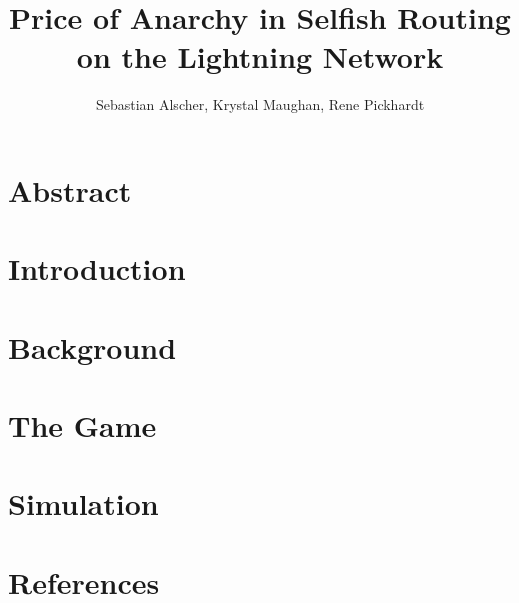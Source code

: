 \documentclass[10pt]{article}
\title{Price of Anarchy in Selfish Routing on the Lightning Network}
\author{Sebastian Alscher, Krystal Maughan, Rene Pickhardt}
\date{}
\newcommand{\mynote}[2]
    {{\color{red} \fbox{\bfseries\sffamily\scriptsize#1}
    {\small$\blacktriangleright$\textsf{\emph{#2}}$\blacktriangleleft$}}~}
\newcommand{\jn}[1]{\mynote{JN}{#1}}
\renewcommand{\jn}[1]{}
\begin{document}
\maketitle


\section*{Abstract}

\section*{Introduction}

\section*{Background}

\section*{The Game}

\section*{Simulation}

\section*{References}
\end{document}
